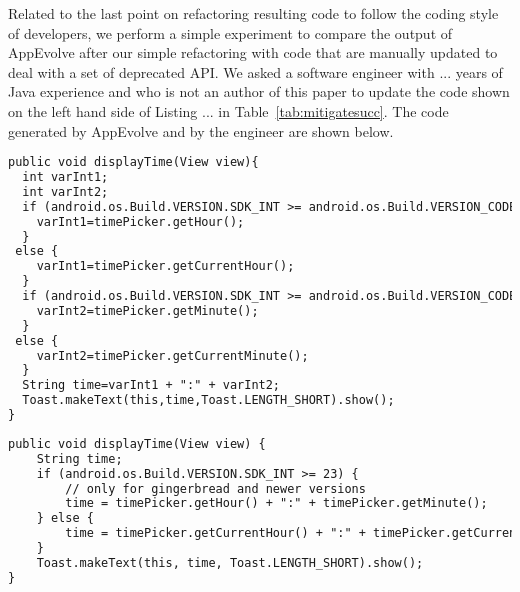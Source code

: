 Related to the last point on refactoring resulting code to follow the coding style of developers, we perform a simple experiment to compare the output of AppEvolve after our simple refactoring with code that are manually updated to deal with a set of deprecated API.  We
asked a software engineer with ... years of Java experience and who is not an author of this paper to update the code shown on the left hand side of Listing ... in Table~\ref{tab:mitigatesucc}. The code generated by AppEvolve and by the engineer are shown below.


\vspace{0.2cm}
\vspace{0.5cm}\begin{lstlisting}[language=diff,numbers=none]
public void displayTime(View view){
  int varInt1;
  int varInt2;
  if (android.os.Build.VERSION.SDK_INT >= android.os.Build.VERSION_CODES.M) {
    varInt1=timePicker.getHour();
  }
 else {
    varInt1=timePicker.getCurrentHour();
  }
  if (android.os.Build.VERSION.SDK_INT >= android.os.Build.VERSION_CODES.M) {
    varInt2=timePicker.getMinute();
  }
 else {
    varInt2=timePicker.getCurrentMinute();
  }
  String time=varInt1 + ":" + varInt2;
  Toast.makeText(this,time,Toast.LENGTH_SHORT).show();
}
\end{lstlisting}


\vspace{0.7cm}
\vspace{0.5cm}\begin{lstlisting}[language=diff,numbers=none]
public void displayTime(View view) {
    String time;
    if (android.os.Build.VERSION.SDK_INT >= 23) {
        // only for gingerbread and newer versions
        time = timePicker.getHour() + ":" + timePicker.getMinute();
    } else {
        time = timePicker.getCurrentHour() + ":" + timePicker.getCurrentMinute();
    }
    Toast.makeText(this, time, Toast.LENGTH_SHORT).show();
}
\end{lstlisting}

